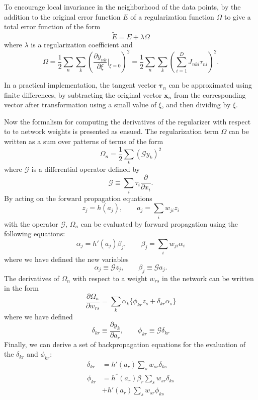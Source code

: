 \documentclass[a4paper]{book}
\renewcommand{\bf}{\mathbf}
\renewcommand{\cal}{\mathcal}
\newcommand{\bs}{\boldsymbol}
\begin{document}
To encourage local invariance in the neighborhood of the data points, by the addition to the original error function $E$ of a regularization function $\Omega$ to give a total error function of the form
\begin{equation}
	\tilde{E} = E + \lambda \Omega
\end{equation}
where $\lambda$ is a regularization coefficient and
\begin{equation}
	\Omega = \frac{1}{2} \sum_n \sum_k \left(\frac{\partial y_{nk}}{\partial \xi}\bigg|_{\xi = 0} \right)^2 =\frac{1}{2} \sum_n \sum_k \left(\sum_{i=1}^{D}J_{nki}\tau_{ni}\right)^2.
\end{equation}

In a practical implementation, the tangent vector $\bs{\tau}_n$ can be approximated using finite differences, by subtracting the original vector $\bf{x}_n$ from the corresponding vector after transformation using a small value of $\xi$, and then dividing by $\xi$.

Now the formalism for computing the derivatives of the regularizer with respect to te network weights is presented as ensued. The regularization term $\Omega$ can be written as a sum over patterns of terms of the form
\begin{equation}
	\Omega_n = \frac{1}{2} \sum_k (\cal{G}y_k)^2
\end{equation}
where $\cal{G}$ is a differential operator defined by 
\begin{equation}
	\cal{G} \equiv \sum_i \tau_i \frac{\partial}{\partial x_i}.
\end{equation}
By acting on the forward propagation equations
\begin{equation}
	z_j = h(a_j), \qquad a_j = \sum_i w_{ji}z_i
\end{equation}
with the operator $\cal{G}$, $\Omega_n$  can be evaluated by forward propagation using the following equations:
\begin{equation}
	\alpha_j = h'(a_j) \beta_j , \qquad \beta_j = \sum_i w_{ji} \alpha_i
\end{equation}
where we have defined the new variables
\begin{equation}
	\alpha_j \equiv \cal{G} z_j, \qquad \beta_j \equiv \cal{G} a_j.
\end{equation}
The derivatives of $\Omega_n$ with respect to a weight $w_{rs}$ in the network can be written in the form
\begin{equation}
	\frac{\partial \Omega_n}{\partial w_{rs}} = \sum_k \alpha_k \{\phi_{kr}z_s + \delta_{kr}\alpha_s  \}
\end{equation}
where we have defined
\begin{equation}
	\delta_{kr} \equiv \frac{\partial y_k}{\partial a_r}, \qquad \phi_{kr} \equiv \cal{G} \delta_{kr}
\end{equation}
Finally, we can derive a set of backpropagation equations for the evaluation of the $\delta_{kr}$ and $\phi_{kr}$:
\begin{align}
	\delta_{kr} &= h'(a_r) \sum_s w_{sr} \delta_{ks}\\
	\phi_{kr} &= h^{''}(a_r) \beta_r \sum_s w_{sr} \delta_{ks} \\
	& + h'(a_r) \sum_s w_{sr} \phi_{ks}
\end{align}
\end{document}
